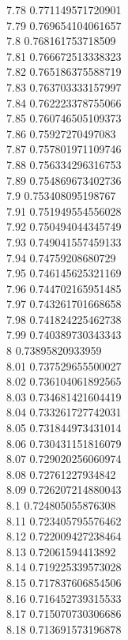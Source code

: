 {7.78	0.771149571720901\\
7.79	0.769654104061657\\
7.8	0.768161753718509\\
7.81	0.766672513338323\\
7.82	0.765186375588719\\
7.83	0.763703333157997\\
7.84	0.762223378755066\\
7.85	0.760746505109373\\
7.86	0.75927270497083\\
7.87	0.757801971109746\\
7.88	0.756334296316753\\
7.89	0.754869673402736\\
7.9	0.753408095198767\\
7.91	0.751949554556028\\
7.92	0.750494044345749\\
7.93	0.749041557459133\\
7.94	0.74759208680729\\
7.95	0.746145625321169\\
7.96	0.744702165951485\\
7.97	0.743261701668658\\
7.98	0.741824225462738\\
7.99	0.740389730343343\\
8	0.73895820933959\\
8.01	0.737529655500027\\
8.02	0.736104061892565\\
8.03	0.734681421604419\\
8.04	0.733261727742031\\
8.05	0.731844973431014\\
8.06	0.730431151816079\\
8.07	0.729020256060974\\
8.08	0.72761227934842\\
8.09	0.726207214880043\\
8.1	0.724805055876308\\
8.11	0.723405795576462\\
8.12	0.722009427238464\\
8.13	0.72061594413892\\
8.14	0.719225339573028\\
8.15	0.717837606854506\\
8.16	0.716452739315533\\
8.17	0.715070730306686\\
8.18	0.713691573196878\\
}
